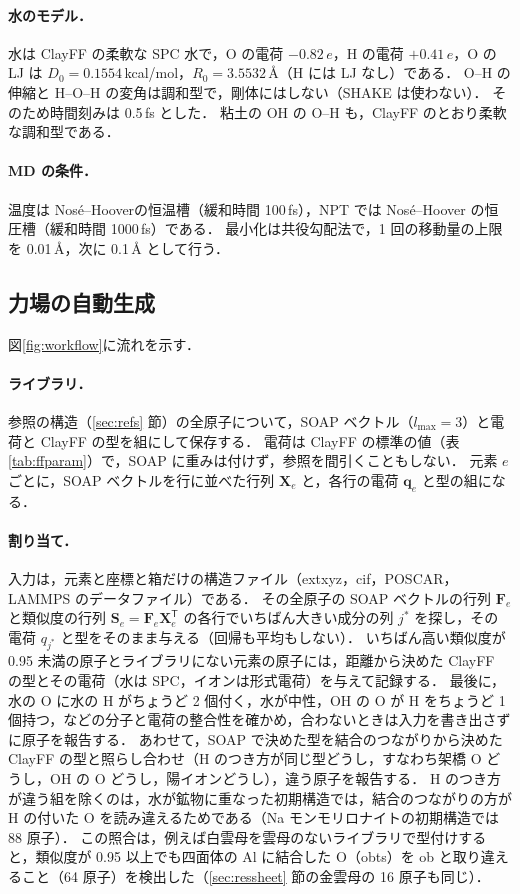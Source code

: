 \documentclass[a4paper,11pt]{article}
\newcommand{\e}{\,e}
\begin{document}
\paragraph{水のモデル．}
水は ClayFF の柔軟な SPC 水で，O の電荷 $-0.82\e$，H の電荷 $+0.41\e$，O の LJ は $D_0=0.1554$\,kcal/mol，$R_0=3.5532$\,\AA（H には LJ なし）である．
O--H の伸縮と H--O--H の変角は調和型で，剛体にはしない（SHAKE は使わない）．
そのため時間刻みは 0.5\,fs とした．
粘土の OH の O--H も，ClayFF のとおり柔軟な調和型である．

\paragraph{MD の条件．}
温度は Nosé--Hoover\cite{nose1984,hoover1985}の恒温槽（緩和時間 100\,fs），NPT では Nosé--Hoover の恒圧槽（緩和時間 1000\,fs）である．
最小化は共役勾配法で，1 回の移動量の上限を 0.01\,\AA，次に 0.1\,\AA{} として行う．

\subsection{力場の自動生成}
図\ref{fig:workflow}に流れを示す．
\paragraph{ライブラリ．}
参照の構造（\ref{sec:refs} 節）の全原子について，SOAP ベクトル（$l_{\max}=3$）と電荷と ClayFF の型を組にして保存する．
電荷は ClayFF の標準の値（表\ref{tab:ffparam}）で，SOAP に重みは付けず，参照を間引くこともしない．
元素 $e$ ごとに，SOAP ベクトルを行に並べた行列 $\mathbf{X}_e$ と，各行の電荷 $\mathbf{q}_e$ と型の組になる．
\paragraph{割り当て．}
入力は，元素と座標と箱だけの構造ファイル（extxyz，cif，POSCAR，LAMMPS のデータファイル）である．
その全原子の SOAP ベクトルの行列 $\mathbf{F}_e$ と類似度の行列 $\mathbf{S}_e = \mathbf{F}_e\mathbf{X}_e^{\mathsf{T}}$ の各行でいちばん大きい成分の列 $j^*$ を探し，その電荷 $q_{j^*}$ と型をそのまま与える（回帰も平均もしない）．
いちばん高い類似度が 0.95 未満の原子とライブラリにない元素の原子には，距離から決めた ClayFF の型とその電荷（水は SPC，イオンは形式電荷）を与えて記録する．
最後に，水の O に水の H がちょうど 2 個付く，水が中性，OH の O が H をちょうど 1 個持つ，などの分子と電荷の整合性を確かめ，合わないときは入力を書き出さずに原子を報告する．
あわせて，SOAP で決めた型を結合のつながりから決めた ClayFF の型と照らし合わせ（H のつき方が同じ型どうし，すなわち架橋 O どうし，OH の O どうし，陽イオンどうし），違う原子を報告する．
H のつき方が違う組を除くのは，水が鉱物に重なった初期構造では，結合のつながりの方が H の付いた O を読み違えるためである（Na モンモリロナイトの初期構造では 88 原子）．
この照合は，例えば白雲母を雲母のないライブラリで型付けすると，類似度が 0.95 以上でも四面体の Al に結合した O（obts）を ob と取り違えること（64 原子）を検出した（\ref{sec:ressheet} 節の金雲母の 16 原子も同じ）．
\end{document}
